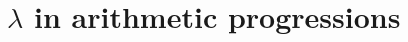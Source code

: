 \documentclass{amsart}
\newtheorem{lemma}[theorem]{Lemma}
\begin{document}
\section{$\lambda$ in arithmetic progressions}\label{Deflambda}


\end{document}
